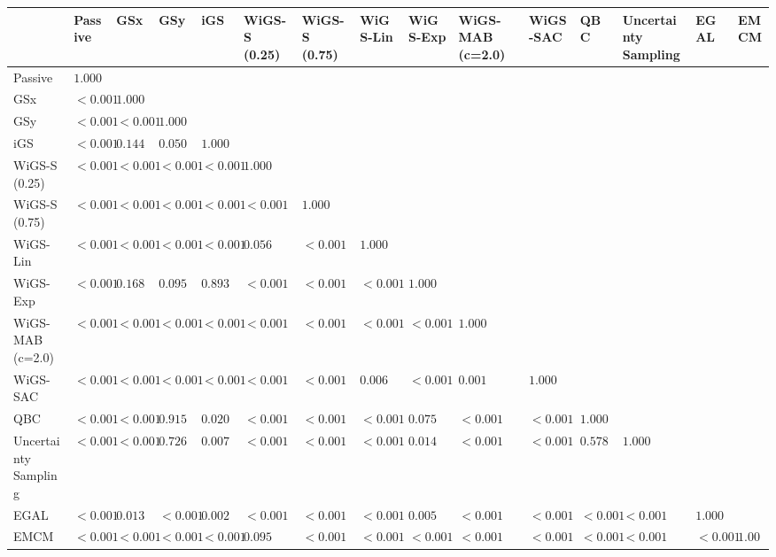 \begin{tabular}{lllllllllllllll}
\toprule
 & Passive & GSx & GSy & iGS & WiGS-S (0.25) & WiGS-S (0.75) & WiGS-Lin & WiGS-Exp & WiGS-MAB (c=2.0) & WiGS-SAC & QBC & Uncertainty Sampling & EGAL & EMCM \\
\midrule
Passive & $1.000$ &  &  &  &  &  &  &  &  &  &  &  &  &  \\
GSx & $<0.001$ & $1.000$ &  &  &  &  &  &  &  &  &  &  &  &  \\
GSy & $<0.001$ & $<0.001$ & $1.000$ &  &  &  &  &  &  &  &  &  &  &  \\
iGS & $<0.001$ & $0.144$ & $0.050$ & $1.000$ &  &  &  &  &  &  &  &  &  &  \\
WiGS-S (0.25) & $<0.001$ & $<0.001$ & $<0.001$ & $<0.001$ & $1.000$ &  &  &  &  &  &  &  &  &  \\
WiGS-S (0.75) & $<0.001$ & $<0.001$ & $<0.001$ & $<0.001$ & $<0.001$ & $1.000$ &  &  &  &  &  &  &  &  \\
WiGS-Lin & $<0.001$ & $<0.001$ & $<0.001$ & $<0.001$ & $0.056$ & $<0.001$ & $1.000$ &  &  &  &  &  &  &  \\
WiGS-Exp & $<0.001$ & $0.168$ & $0.095$ & $0.893$ & $<0.001$ & $<0.001$ & $<0.001$ & $1.000$ &  &  &  &  &  &  \\
WiGS-MAB (c=2.0) & $<0.001$ & $<0.001$ & $<0.001$ & $<0.001$ & $<0.001$ & $<0.001$ & $<0.001$ & $<0.001$ & $1.000$ &  &  &  &  &  \\
WiGS-SAC & $<0.001$ & $<0.001$ & $<0.001$ & $<0.001$ & $<0.001$ & $<0.001$ & $0.006$ & $<0.001$ & $0.001$ & $1.000$ &  &  &  &  \\
QBC & $<0.001$ & $<0.001$ & $0.915$ & $0.020$ & $<0.001$ & $<0.001$ & $<0.001$ & $0.075$ & $<0.001$ & $<0.001$ & $1.000$ &  &  &  \\
Uncertainty Sampling & $<0.001$ & $<0.001$ & $0.726$ & $0.007$ & $<0.001$ & $<0.001$ & $<0.001$ & $0.014$ & $<0.001$ & $<0.001$ & $0.578$ & $1.000$ &  &  \\
EGAL & $<0.001$ & $0.013$ & $<0.001$ & $0.002$ & $<0.001$ & $<0.001$ & $<0.001$ & $0.005$ & $<0.001$ & $<0.001$ & $<0.001$ & $<0.001$ & $1.000$ &  \\
EMCM & $<0.001$ & $<0.001$ & $<0.001$ & $<0.001$ & $0.095$ & $<0.001$ & $<0.001$ & $<0.001$ & $<0.001$ & $<0.001$ & $<0.001$ & $<0.001$ & $<0.001$ & $1.000$ \\
\bottomrule
\end{tabular}
